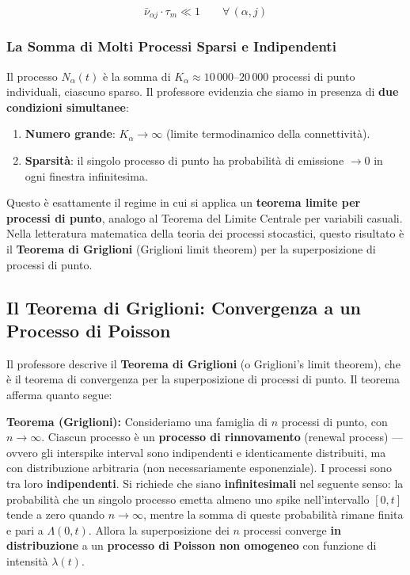 \begin{equation}
\bar{\nu}_{\alpha j} \cdot \tau_m \ll 1 \qquad \forall\, (\alpha, j)
\end{equation}

\subsubsection{La Somma di Molti Processi Sparsi e Indipendenti}

Il processo $N_\alpha(t)$ è la somma di $K_\alpha \approx 10\,000$–$20\,000$ processi di punto individuali, ciascuno sparso. Il professore evidenzia che siamo in presenza di \textbf{due condizioni simultanee}:

\begin{enumerate}
    \item \textbf{Numero grande}: $K_\alpha \to \infty$ (limite termodinamico della connettività).
    \item \textbf{Sparsità}: il singolo processo di punto ha probabilità di emissione $\to 0$ in ogni finestra infinitesima.
\end{enumerate}

Questo è esattamente il regime in cui si applica un \textbf{teorema limite per processi di punto}, analogo al Teorema del Limite Centrale per variabili casuali. Nella letteratura matematica della teoria dei processi stocastici, questo risultato è il \textbf{Teorema di Griglioni} (Griglioni limit theorem) per la superposizione di processi di punto.



\subsection{Il Teorema di Griglioni: Convergenza a un Processo di Poisson}

Il professore descrive il \textbf{Teorema di Griglioni} (o Griglioni's limit theorem), che è il teorema di convergenza per la superposizione di processi di punto. Il teorema afferma quanto segue:

\textbf{Teorema (Griglioni):} Consideriamo una famiglia di $n$ processi di punto, con $n \to \infty$. Ciascun processo è un \textbf{processo di rinnovamento} (renewal process) — ovvero gli interspike interval sono indipendenti e identicamente distribuiti, ma con distribuzione arbitraria (non necessariamente esponenziale). I processi sono tra loro \textbf{indipendenti}. Si richiede che siano \textbf{infinitesimali} nel seguente senso: la probabilità che un singolo processo emetta almeno uno spike nell'intervallo $[0, t]$ tende a zero quando $n \to \infty$, mentre la somma di queste probabilità rimane finita e pari a $\Lambda(0, t)$. Allora la superposizione dei $n$ processi converge \textbf{in distribuzione} a un \textbf{processo di Poisson non omogeneo} con funzione di intensità $\lambda(t)$.

